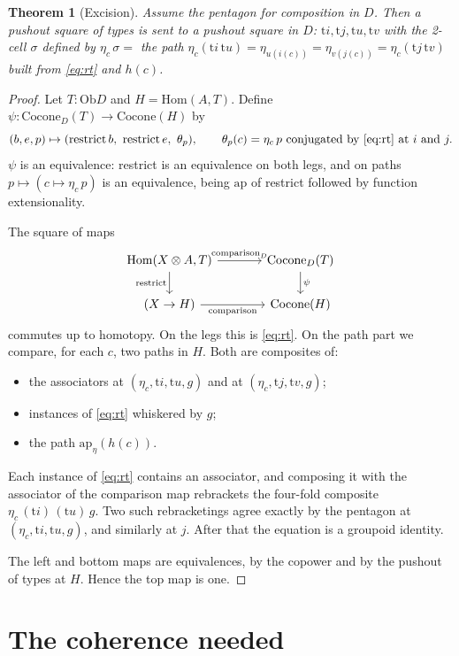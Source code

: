 \documentclass[11pt]{amsart}
\numberwithin{equation}{section}
\newtheorem{theorem}{Theorem}[section]
\theoremstyle{definition}
\theoremstyle{remark}
\newcommand{\Ob}{\mathrm{Ob}}
\newcommand{\Hom}{\mathrm{Hom}}
\newcommand{\Cocone}{\mathrm{Cocone}}
\newcommand{\tmap}{\mathrm{t}}
\begin{document}
\begin{theorem}[Excision]
Assume the pentagon for composition in $D$. Then a pushout square of types is
sent to a pushout square in $D$:
$\tmap i,\tmap j,\tmap u,\tmap v$ with the 2-cell $\sigma$ defined by
$\eta_c\,\sigma = $ the path
$\eta_c(\tmap i\,\tmap u)=\eta_{u(i(c))}=\eta_{v(j(c))}=\eta_c(\tmap j\,\tmap v)$
built from \eqref{eq:rt} and $h(c)$.
\end{theorem}
\begin{proof}
Let $T:\Ob D$ and $H=\Hom(A,T)$. Define
$\psi:\Cocone_D(T)\to\Cocone(H)$ by
\[ (b,e,p)\mapsto(\mathrm{restrict}\,b,\ \mathrm{restrict}\,e,\ \theta_p),\qquad
\theta_p(c) = \eta_c\,p \text{ conjugated by \eqref{eq:rt} at } i \text{ and } j. \]
$\psi$ is an equivalence: restrict is an equivalence on both legs, and on
paths $p\mapsto(c\mapsto\eta_c\,p)$ is an equivalence, being $\mathrm{ap}$ of
restrict followed by function extensionality.

The square of maps
\[\begin{tikzcd}[column sep=large]
\Hom(X\otimes A,T)\ar[r,"\text{comparison}_D"]\ar[d,"\mathrm{restrict}"'] &
\Cocone_D(T)\ar[d,"\psi"]\\ (X\to H)\ar[r,"\text{comparison}"'] & \Cocone(H)
\end{tikzcd}\]
commutes up to homotopy. On the legs this is \eqref{eq:rt}. On the path part
we compare, for each $c$, two paths in $H$. Both are composites of:
\begin{itemize}
\item the associators at $(\eta_c,\tmap i,\tmap u,g)$ and at
  $(\eta_c,\tmap j,\tmap v,g)$;
\item instances of \eqref{eq:rt} whiskered by $g$;
\item the path $\mathrm{ap}_\eta(h(c))$.
\end{itemize}
Each instance of \eqref{eq:rt} contains an associator, and composing it with
the associator of the comparison map rebrackets the four-fold composite
$\eta_c\,(\tmap i)\,(\tmap u)\,g$. Two such rebracketings agree exactly by the
pentagon at $(\eta_c,\tmap i,\tmap u,g)$, and similarly at $j$. After that the
equation is a groupoid identity.

The left and bottom maps are equivalences, by the copower and by the pushout
of types at $H$. Hence the top map is one.
\end{proof}

\section{The coherence needed}\label{sec:coh}
\end{document}
